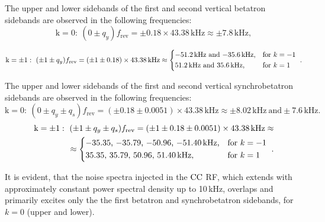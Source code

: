 The upper and lower sidebands of the first and second vertical betatron sidebands are observed in the following frequencies:
\begin{equation}\label{eq:betatron_sideband_1}
    \mathrm{k=0}: \ (0 \pm q_y) f_\mathrm{rev} = \pm 0.18 \times 43.38\mathrm{\,kHz} \approx \pm 7.8\mathrm{\,kHz},
\end{equation}

\begin{equation}\label{eq:betatron_sideband_2}
   \mathrm{k= \pm 1}: \ (\pm 1 \pm q_y) f_\mathrm{rev} = (\pm 1 \pm 0.18) \times 43.38\mathrm{\,kHz} \approx \begin{dcases*} 
       \text{$-$51.2\,kHz and $-$35.6\,kHz,} & for  $k=-1$ \\ 
       \text{51.2\,kHz and 35.6\,kHz,} & for  $k=1$  
       \end{dcases*} .
\end{equation}

The upper and lower sidebands of the first and second vertical synchrobetatron sidebands are observed in the following frequencies:
\begin{equation}\label{eq:synchrobetatron_sideband_1}
    \mathrm{k=0}: \ (0 \pm q_y \pm q_s) f_\mathrm{rev} = (\pm 0.18 \pm 0.0051) \times 43.38\mathrm{\,kHz} \approx \pm 8.02\mathrm{\,kHz} \ \mathrm{and} \pm 7.6\mathrm{\,kHz}.
\end{equation}
\begin{equation}\label{eq:synchrobetatron_sideband_2}
    \begin{split}
    \mathrm{k= \pm 1}: \ (\pm 1 \pm q_y \pm q_s) f_\mathrm{rev} = (\pm 1 \pm 0.18 \pm 0.0051)\times 43.38\mathrm{\,kHz} \approx \\ 
    \approx \begin{dcases*} 
        \text{$-$35.35, $-$35.79, $-$50.96, $-$51.40\,kHz,} & for  $k=-1$ \\ 
        \text{35.35, 35.79, 50.96, 51.40\,kHz,} & for  $k=1$  
        \end{dcases*} .
    \end{split}
\end{equation}

It is evident, that the noise spectra injected in the ${\mathrm{CC}}$ RF, which extends with approximately constant power spectral density up to 10\,kHz, overlaps and primarily excites only the the first betatron and synchrobetatron sidebands, for $k=0$ (upper and lower).






